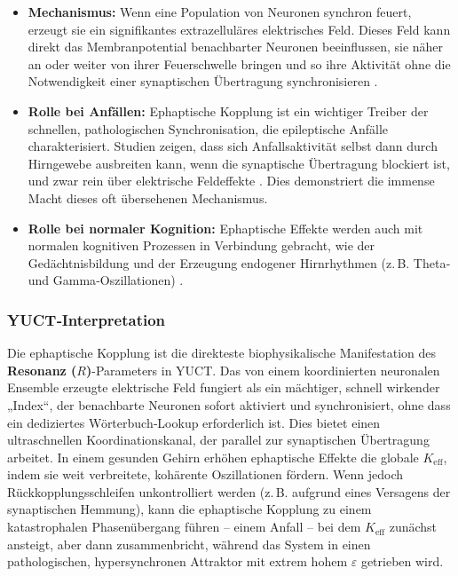 \documentclass[12pt,a4paper]{article}
\begin{document}
	\begin{itemize}
		\item \textbf{Mechanismus:} Wenn eine Population von Neuronen synchron feuert, erzeugt sie ein signifikantes extrazelluläres elektrisches Feld. Dieses Feld kann direkt das Membranpotential benachbarter Neuronen beeinflussen, sie näher an oder weiter von ihrer Feuerschwelle bringen und so ihre Aktivität ohne die Notwendigkeit einer synaptischen Übertragung synchronisieren \cite{Frohlich2010}.
		\item \textbf{Rolle bei Anfällen:} Ephaptische Kopplung ist ein wichtiger Treiber der schnellen, pathologischen Synchronisation, die epileptische Anfälle charakterisiert. Studien zeigen, dass sich Anfallsaktivität selbst dann durch Hirngewebe ausbreiten kann, wenn die synaptische Übertragung blockiert ist, und zwar rein über elektrische Feldeffekte \cite{Zhang2022, Dudek1998}. Dies demonstriert die immense Macht dieses oft übersehenen Mechanismus.
		\item \textbf{Rolle bei normaler Kognition:} Ephaptische Effekte werden auch mit normalen kognitiven Prozessen in Verbindung gebracht, wie der Gedächtnisbildung und der Erzeugung endogener Hirnrhythmen (z. B. Theta‑ und Gamma‑Oszillationen) \cite{Anastassiou2011}.
	\end{itemize}
	
	\subsubsection*{YUCT‑Interpretation}
	Die ephaptische Kopplung ist die direkteste biophysikalische Manifestation des \textbf{Resonanz (\(R\))}-Parameters in YUCT. Das von einem koordinierten neuronalen Ensemble erzeugte elektrische Feld fungiert als ein mächtiger, schnell wirkender „Index“, der benachbarte Neuronen sofort aktiviert und synchronisiert, ohne dass ein dediziertes Wörterbuch‑Lookup erforderlich ist. Dies bietet einen ultraschnellen Koordinationskanal, der parallel zur synaptischen Übertragung arbeitet. In einem gesunden Gehirn erhöhen ephaptische Effekte die globale \(K_{\mathrm{eff}}\), indem sie weit verbreitete, kohärente Oszillationen fördern. Wenn jedoch Rückkopplungsschleifen unkontrolliert werden (z. B. aufgrund eines Versagens der synaptischen Hemmung), kann die ephaptische Kopplung zu einem katastrophalen Phasenübergang führen – einem Anfall – bei dem \(K_{\mathrm{eff}}\) zunächst ansteigt, aber dann zusammenbricht, während das System in einen pathologischen, hypersynchronen Attraktor mit extrem hohem \(\varepsilon\) getrieben wird.
	
\end{document}
